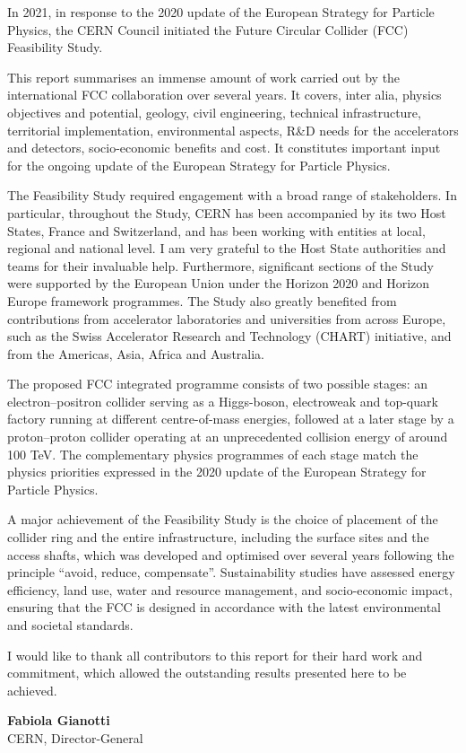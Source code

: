 In 2021, in response to the 2020 update of the European Strategy for Particle Physics, the CERN Council initiated the Future Circular Collider (FCC) Feasibility Study. 

This report summarises an immense amount of work carried out by the international FCC collaboration over several years. It covers, inter alia, physics objectives and potential, geology, civil engineering, technical infrastructure, territorial implementation, environmental aspects, R\&D needs for the accelerators and detectors, socio-economic benefits and cost. It constitutes important input for the ongoing update of the European Strategy for Particle Physics.

The Feasibility Study required engagement with a broad range of stakeholders. In particular, throughout the Study, CERN has been accompanied by its two Host States, France and Switzerland, and has been working with entities at local, regional and national level. I am very grateful to the Host State authorities and teams for their invaluable help. Furthermore, significant sections of the Study were supported by the European Union under the Horizon 2020 and Horizon Europe framework programmes. The Study also greatly benefited from contributions from accelerator laboratories and universities from across Europe, such as the Swiss Accelerator Research and Technology (CHART) initiative, and from the Americas, Asia, Africa and Australia. 

The proposed FCC integrated programme consists of two possible stages: an electron–positron collider serving as a Higgs-boson, electroweak and top-quark factory running at different centre-of-mass energies, followed at a later stage by a proton–proton collider operating at an unprecedented collision energy of around 100 TeV. The complementary physics programmes of each stage match the physics priorities expressed in the 2020 update of the European Strategy for Particle Physics. 

A major achievement of the Feasibility Study is the choice of placement of the collider ring and the entire infrastructure, including the surface sites and the access shafts, which was developed and optimised over several years following the principle “avoid, reduce, compensate”. Sustainability studies have assessed energy efficiency, land use, water and resource management, and socio-economic impact, ensuring that the FCC is designed in accordance with the latest environmental and societal standards. 

I would like to thank all contributors to this report for their hard work and commitment, which allowed the outstanding results presented here to be achieved. 


\begin{flushright}
\textbf{Fabiola Gianotti}\\
CERN, Director-General
\end{flushright}